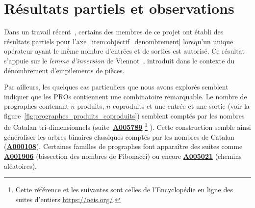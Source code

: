 \documentclass[10pt,reqno]{amsart}
\numberwithin{equation}{subsection}
\newcommand{\OEIS}[1]{\href{http://oeis.org/#1}{{\bf #1}}}
\begin{document}
\section{Résultats partiels et observations}
Dans un travail récent~\cite{BG14}, certains des membres de ce projet 
ont établi des résultats partiels pour 
l'axe~\ref{item:objectif_denombrement} lorsqu'un unique opérateur 
ayant le même nombre d'entrées et de sorties est autorisé. Ce résultat 
s'appuie sur le {\em lemme d'inversion} de Viennot~\cite{Vie86},
introduit dans le contexte du dénombrement d'empilements de pièces. 


Par ailleurs, les quelques cas particuliers que nous avons explorés 
semblent indiquer 
que les PROs contiennent une combinatoire remarquable. Le nombre de 
prographes contenant $n$ produits, $n$ coproduits et une entrée et une 
sortie (voir la
figure~\ref{fig:prographes_produits_coproduits}) semblent comptés par 
les nombres de Catalan tri-dimensionnels (suite~\OEIS{A005789}%
\footnote{Cette référence et les suivantes sont celles de l'Encyclopédie 
en ligne des suites d'entiers \url{https://oeis.org/}.}%
). Cette construction semble ainsi généraliser les arbres binaires 
classiques comptés par les nombres de Catalan (\OEIS{A000108}). Certaines
familles de prographes font apparaître des suites comme \OEIS{A001906}
(bissection des nombres de Fibonacci) ou encore \OEIS{A005021} (chemins
aléatoires).
\end{document}
